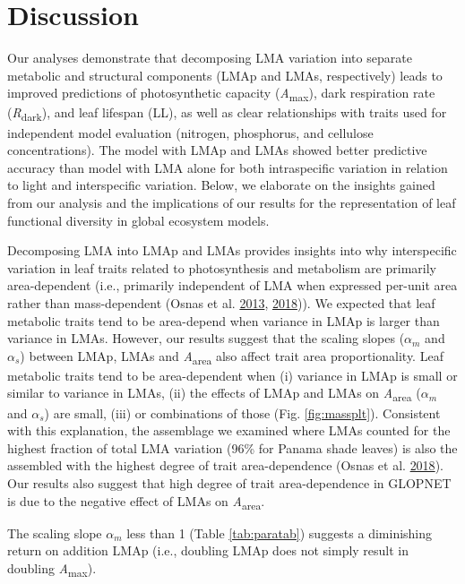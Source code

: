 \documentclass[
  12pt,
]{article}
\begin{document}
\hypertarget{discussion}{%
\section{Discussion}\label{discussion}}

Our analyses demonstrate that decomposing LMA variation into separate metabolic and structural components (LMAp and LMAs, respectively) leads to improved predictions of photosynthetic capacity (\emph{A}\textsubscript{max}), dark respiration rate (\emph{R}\textsubscript{dark}), and leaf lifespan (LL), as well as clear relationships with traits used for independent model evaluation (nitrogen, phosphorus, and cellulose concentrations).
The model with LMAp and LMAs showed better predictive accuracy than model with LMA alone for both intraspecific variation in relation to light and interspecific variation.
Below, we elaborate on the insights gained from our analysis and the implications of our results for the representation of leaf functional diversity in global ecosystem models.

Decomposing LMA into LMAp and LMAs provides insights into why interspecific variation in leaf traits related to photosynthesis and metabolism are primarily area-dependent (i.e., primarily independent of LMA when expressed per-unit area rather than mass-dependent (Osnas et al. \protect\hyperlink{ref-Osnas2013}{2013}, \protect\hyperlink{ref-Osnas2018}{2018})).
We expected that leaf metabolic traits tend to be area-depend when variance in LMAp is larger than variance in LMAs.
However, our results suggest that the scaling slopes (\(\alpha_m\) and \(\alpha_s\)) between LMAp, LMAs and \emph{A}\textsubscript{area} also affect trait area proportionality.
Leaf metabolic traits tend to be area-dependent when (i) variance in LMAp is small or similar to variance in LMAs, (ii) the effects of LMAp and LMAs on \emph{A}\textsubscript{area} (\(\alpha_m\) and \(\alpha_s\)) are small, (iii) or combinations of those (Fig. \ref{fig:massplt}).
Consistent with this explanation, the assemblage we examined where LMAs counted for the highest fraction of total LMA variation (96\% for Panama shade leaves) is also the assembled with the highest degree of trait area-dependence (Osnas et al. \protect\hyperlink{ref-Osnas2018}{2018}).
Our results also suggest that high degree of trait area-dependence in GLOPNET is due to the negative effect of LMAs on \emph{A}\textsubscript{area}.

The scaling slope \(\alpha_m\) less than 1 (Table \ref{tab:paratab}) suggests a diminishing return on addition LMAp (i.e., doubling LMAp does not simply result in doubling \emph{A}\textsubscript{max}).
\end{document}

